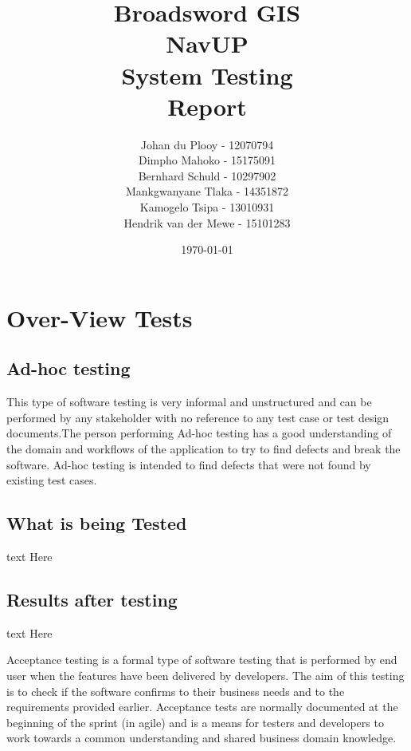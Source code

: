 \documentclass[12pt]{article}
\begin{document}
\title{\Huge Broadsword GIS \\ NavUP \\ System Testing \\ Report}
\author{\Large Johan du Plooy - 12070794 \\
		\Large Dimpho Mahoko - 15175091 \\
		\Large Bernhard Schuld - 10297902 \\
		\Large Mankgwanyane Tlaka - 14351872 \\
		\Large Kamogelo Tsipa - 13010931 \\
		\Large Hendrik van der Mewe - 15101283}
\date{\today}
\maketitle

\newpage
\tableofcontents
\newpage


\section{Over-View Tests}
	
	\subsection{Ad-hoc testing}
		This type of software testing is very informal and unstructured and can be performed by any stakeholder with no 			reference to 	any test case or test design documents.The person performing Ad-hoc testing has a good understanding of 		the domain and workflows of the application to try to find defects and break the software. Ad-hoc testing is intended to 		 find defects that were not found by existing test cases.
		
		\subsection{What is being Tested}
		text Here
		\subsection{Results after testing}
		text Here
	
		Acceptance testing is a formal type of software testing that is performed by end user when the features have been 			delivered by developers. The aim of this testing is to check if the software confirms to their business needs and to the 		 requirements provided earlier. Acceptance tests are normally documented at the beginning of the sprint (in agile) and is 		  a means for testers and developers to work towards a common understanding and shared business domain knowledge.
\end{document}
